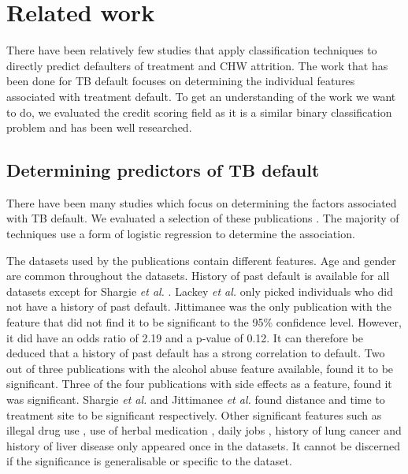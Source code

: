 \documentclass{sig-alternate-05-2015}
\begin{document}
	\section{Related work}
	There have been relatively few studies that apply classification techniques to directly predict defaulters of treatment and CHW attrition. The work that has been done for TB default focuses on determining the individual features associated with treatment default. To get an understanding of the work we want to do, we evaluated the credit scoring field as it is a similar binary classification problem and has been well researched. 
	\subsection{Determining predictors of TB default}
	\label{predictors_of_defaulters_related_work}
	There have been many studies which focus on determining the factors associated with TB default. We evaluated a selection of these publications \cite{chan:2003prevalence, Jha:10.1371/journal.pone.0008873, jittimanee:10.1111/j.1440-172X.2007.00650.x, Lackey:10356751520150601, muture:6660173120110101, Shargie:10.1371/journal.pmed.0040037}. The majority of techniques use a form of logistic regression to determine the association. 
	
	The datasets used by the publications contain different features. Age and gender are common throughout the datasets. History of past default is available for all datasets except for Shargie \textit{et al.} \cite{Shargie:10.1371/journal.pmed.0040037}. Lackey \textit{et al.} \cite{Lackey:10356751520150601} only picked individuals who did not have a history of past default. Jittimanee \cite{jittimanee:10.1111/j.1440-172X.2007.00650.x} was the only publication with the feature that did not find it to be significant to the 95\% confidence level. However, it did have an odds ratio of 2.19 and a p-value of 0.12. It can therefore be deduced that a history of past default has a strong correlation to default. Two out of three publications with the alcohol abuse feature available, found it to be significant. Three of the four publications with side effects as a feature, found it was significant. Shargie \textit{et al.} \cite{Shargie:10.1371/journal.pmed.0040037} and Jittimanee \textit{et al.} \cite{jittimanee:10.1111/j.1440-172X.2007.00650.x} found distance and time to treatment site to be significant respectively. Other significant features such as illegal drug use \cite{Lackey:10356751520150601}, use of herbal medication \cite{muture:6660173120110101}, daily jobs \cite{jittimanee:10.1111/j.1440-172X.2007.00650.x}, history of lung cancer \cite{chan:2003prevalence} and history of liver disease \cite{chan:2003prevalence} only appeared once in the datasets. It cannot be discerned if the significance is generalisable or specific to the dataset. 
	
\end{document}
